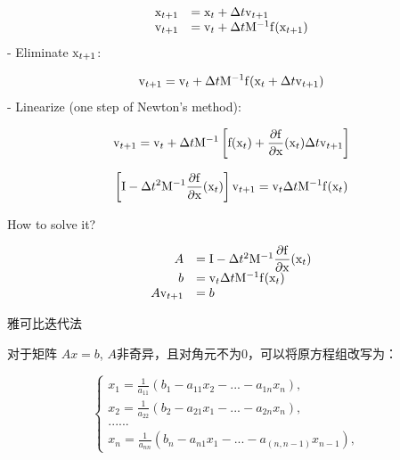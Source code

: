 \documentclass[11pt]{article}
\begin{document}
\begin{equation*}
\begin{array}{rl}
    {\rm x}_ {t+1} &= {\rm x}_ {t}+\Delta t{\rm v}_ {t+1} \\
    {\rm v}_ {t+1} &= {\rm v}_ {t}+\Delta t{\rm M^{-1}f}({\rm x}_{t+1})
\end{array}
\end{equation*} - Eliminate \({\rm x}_ {t+1}\):

\begin{equation*}
    {\rm v}_ {t+1} = {\rm v}_ {t}+\Delta t{\rm M^{-1}f}{({\rm x}_ {t}+\Delta t{\rm v}_ {t+1})} \\
\end{equation*} - Linearize (one step of Newton's method):

\begin{equation*}
    {\rm v}_ {t+1} = {\rm v}_ {t}+\Delta t{\rm M^{-1}}\left[{{\rm f}({\rm x}_ {t})+\displaystyle\frac{\partial{\rm f}}{\partial {\rm x}}({\rm x}_ {t}) \Delta t{\rm v}_ {t+1}} \right]
\end{equation*}

\begin{equation*}
    \left[ {\rm I}-\Delta t^{2}{\rm M^{-1}}\displaystyle\frac{\partial{\rm f}}{\partial{\rm x}}({\rm x}_ {t})\right]{\rm v}_ {t+1}={\rm v}_ {t}\Delta t{\rm M^{-1}f}({\rm x}_{t})
\end{equation*}

How to solve it?

\begin{equation*}
\begin{array}{rl}
    A &= {\rm I}-\Delta t^{2}{\rm M^{-1}}\displaystyle\frac{\partial{\rm f}}{\partial{\rm x}}({\rm x}_ {t}) \\
    b &= {\rm v}_ {t}\Delta t{\rm M^{-1}f}({\rm x}_{t}) \\
    A{\rm v}_ {t+1} &= b
\end{array}
\end{equation*}

雅可比迭代法

对于矩阵 \(Ax=b\), \(A\)非奇异，且对角元不为0，可以将原方程组改写为：

\begin{equation*}
\left\{  
             \begin{array}{lr}  
             x_{1}=\displaystyle\frac{1}{a_{11}}\left(b_{1}-a_{11}x_{2}-...-a_{1n}x_{n}\right), &  \\  
             x_{2}=\displaystyle\frac{1}{a_{22}}\left(b_{2}-a_{21}x_{1}-...-a_{2n}x_{n}\right), & \\ 
             ...... & \\ 
             x_{n}=\displaystyle\frac{1}{a_{nn}}\left(b_{n}-a_{n1}x_{1}-...-a_{(n,n-1)}x_{n-1}\right), &   
             \end{array}  
\right.
\end{equation*}
\end{document}
